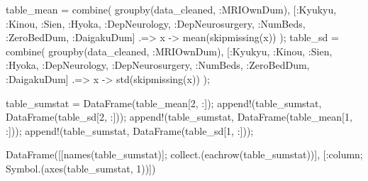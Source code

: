 \documentclass[
  letterpaper,
  DIV=11,
  numbers=noendperiod]{scrreprt}
\newenvironment{Shaded}{\begin{snugshade}}{\end{snugshade}}
\newcommand{\FloatTok}[1]{\textcolor[rgb]{0.68,0.00,0.00}{#1}}
\newcommand{\FunctionTok}[1]{\textcolor[rgb]{0.28,0.35,0.67}{#1}}
\newcommand{\NormalTok}[1]{\textcolor[rgb]{0.00,0.23,0.31}{#1}}
\newcommand{\OperatorTok}[1]{\textcolor[rgb]{0.37,0.37,0.37}{#1}}
\begin{document}
\begin{Shaded}
\begin{Highlighting}[]
\NormalTok{table\_mean }\OperatorTok{=} \FunctionTok{combine}\NormalTok{(}
    \FunctionTok{groupby}\NormalTok{(data\_cleaned, }\OperatorTok{:}\NormalTok{MRIOwnDum),}
\NormalTok{    [}\OperatorTok{:}\NormalTok{Kyukyu, }\OperatorTok{:}\NormalTok{Kinou, }\OperatorTok{:}\NormalTok{Sien, }\OperatorTok{:}\NormalTok{Hyoka, }\OperatorTok{:}\NormalTok{DepNeurology, }\OperatorTok{:}\NormalTok{DepNeurosurgery, }\OperatorTok{:}\NormalTok{NumBeds, }\OperatorTok{:}\NormalTok{ZeroBedDum, }\OperatorTok{:}\NormalTok{DaigakuDum] }\OperatorTok{.=\textgreater{}}\NormalTok{ x }\OperatorTok{{-}\textgreater{}} \FunctionTok{mean}\NormalTok{(}\FunctionTok{skipmissing}\NormalTok{(x))}
\NormalTok{);}
\NormalTok{table\_sd }\OperatorTok{=} \FunctionTok{combine}\NormalTok{(}
    \FunctionTok{groupby}\NormalTok{(data\_cleaned, }\OperatorTok{:}\NormalTok{MRIOwnDum),}
\NormalTok{    [}\OperatorTok{:}\NormalTok{Kyukyu, }\OperatorTok{:}\NormalTok{Kinou, }\OperatorTok{:}\NormalTok{Sien, }\OperatorTok{:}\NormalTok{Hyoka, }\OperatorTok{:}\NormalTok{DepNeurology, }\OperatorTok{:}\NormalTok{DepNeurosurgery, }\OperatorTok{:}\NormalTok{NumBeds, }\OperatorTok{:}\NormalTok{ZeroBedDum, }\OperatorTok{:}\NormalTok{DaigakuDum] }\OperatorTok{.=\textgreater{}}\NormalTok{ x }\OperatorTok{{-}\textgreater{}} \FunctionTok{std}\NormalTok{(}\FunctionTok{skipmissing}\NormalTok{(x))}
\NormalTok{);}

\NormalTok{table\_sumstat }\OperatorTok{=} \FunctionTok{DataFrame}\NormalTok{(table\_mean[}\FloatTok{2}\NormalTok{, }\OperatorTok{:}\NormalTok{]);}
\FunctionTok{append!}\NormalTok{(table\_sumstat, }\FunctionTok{DataFrame}\NormalTok{(table\_sd[}\FloatTok{2}\NormalTok{, }\OperatorTok{:}\NormalTok{]));}
\FunctionTok{append!}\NormalTok{(table\_sumstat, }\FunctionTok{DataFrame}\NormalTok{(table\_mean[}\FloatTok{1}\NormalTok{, }\OperatorTok{:}\NormalTok{]));}
\FunctionTok{append!}\NormalTok{(table\_sumstat, }\FunctionTok{DataFrame}\NormalTok{(table\_sd[}\FloatTok{1}\NormalTok{, }\OperatorTok{:}\NormalTok{]));}

\FunctionTok{DataFrame}\NormalTok{([[}\FunctionTok{names}\NormalTok{(table\_sumstat)]; }\FunctionTok{collect}\NormalTok{.(}\FunctionTok{eachrow}\NormalTok{(table\_sumstat))], [}\OperatorTok{:}\NormalTok{column; }\FunctionTok{Symbol}\NormalTok{.(}\FunctionTok{axes}\NormalTok{(table\_sumstat, }\FloatTok{1}\NormalTok{))])}
\end{Highlighting}
\end{Shaded}
\end{document}
